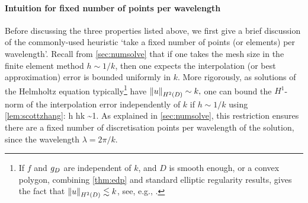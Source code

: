       

\paragraph{Intuition for fixed number of points per wavelength}\label{page:ppw} Before discussing the three properties listed above, we first give a brief discussion of the commonly-used heuristic `take a fixed number of points (or elements) per wavelength'.  Recall from \cref{sec:numsolve} that if one takes the mesh size in the finite element method $h \sim 1/k$, then one expects the interpolation (or best approximation) error is bounded uniformly in $k$. More rigorously, as solutions of the Helmholtz equation typically\footnote{If $f$ and $g_{D}$ are independent of $k$, and $D$ is smooth enough, or a convex polygon, combining \cref{thm:edp} and standard elliptic regularity results, gives the fact that $\NHtD{u} \lesssim k$, see, e.g., \cite[Lemma 2.12]{GaGrSp:15}.} have $\NHtD{u} \sim k,$ one can bound the $H^1$-norm of the interpolation error independently of $k$ if $h \sim 1/k$ using \cref{lem:scottzhang}:
\beqs
{} \lesssim h  \lesssim hk \sim 1.
\eeqs  As explained in \cref{sec:numsolve}, this restriction ensures there are a fixed number of discretisation points per wavelength of the solution, since the wavelength $\lambda = 2\pi/k.$

